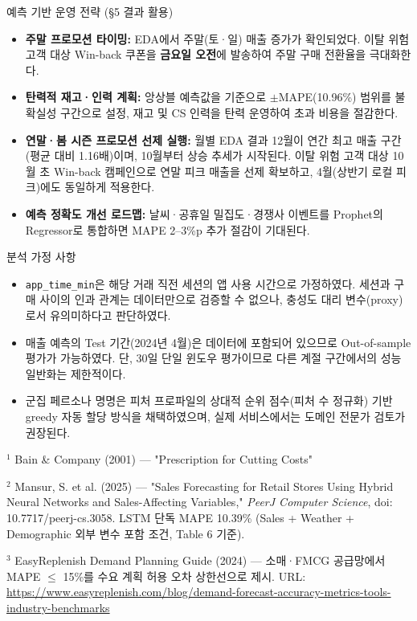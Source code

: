 \documentclass[a4paper, 11pt]{article}
\begin{document}
\begin{infobox}{예측 기반 운영 전략 (§5 결과 활용)}
\begin{itemize}[noitemsep, topsep=2pt]
  \item \textbf{주말 프로모션 타이밍:}
        EDA에서 주말(토·일) 매출 증가가 확인되었다.
        이탈 위험 고객 대상 Win-back 쿠폰을 \textbf{금요일 오전}에 발송하여
        주말 구매 전환율을 극대화한다.
  \item \textbf{탄력적 재고·인력 계획:}
        앙상블 예측값을 기준으로 $\pm$MAPE(10.96\%) 범위를 불확실성 구간으로 설정,
        재고 및 CS 인력을 탄력 운영하여 초과 비용을 절감한다.
  \item \textbf{연말·봄 시즌 프로모션 선제 실행:}
        월별 EDA 결과 12월이 연간 최고 매출 구간(평균 대비 1.16배)이며,
        10월부터 상승 추세가 시작된다. 이탈 위험 고객 대상 10월 초 Win-back 캠페인으로
        연말 피크 매출을 선제 확보하고, 4월(상반기 로컬 피크)에도 동일하게 적용한다.
  \item \textbf{예측 정확도 개선 로드맵:}
        날씨·공휴일 밀집도·경쟁사 이벤트를 Prophet의 Regressor로 통합하면
        MAPE 2–3\%p 추가 절감이 기대된다.
\end{itemize}
\end{infobox}

\begin{warnbox}{분석 가정 사항}
\begin{itemize}[noitemsep, topsep=2pt]
  \item \texttt{app\_time\_min}은 해당 거래 직전 세션의 앱 사용 시간으로 가정하였다.
        세션과 구매 사이의 인과 관계는 데이터만으로 검증할 수 없으나,
        충성도 대리 변수(proxy)로서 유의미하다고 판단하였다.
  \item 매출 예측의 Test 기간(2024년 4월)은 데이터에 포함되어 있으므로
        Out-of-sample 평가가 가능하였다.
        단, 30일 단일 윈도우 평가이므로 다른 계절 구간에서의 성능 일반화는 제한적이다.
  \item 군집 페르소나 명명은 피처 프로파일의 상대적 순위 점수(피처 수 정규화) 기반
        greedy 자동 할당 방식을 채택하였으며, 실제 서비스에서는 도메인 전문가 검토가 권장된다.
\end{itemize}
\end{warnbox}

{\small $^1$ Bain \& Company (2001) — "Prescription for Cutting Costs"}

{\small $^2$ Mansur, S. et al. (2025) — "Sales Forecasting for Retail Stores Using Hybrid Neural Networks and Sales-Affecting Variables," \textit{PeerJ Computer Science}, doi: 10.7717/peerj-cs.3058. LSTM 단독 MAPE 10.39\% (Sales + Weather + Demographic 외부 변수 포함 조건, Table 6 기준).}

{\small $^3$ EasyReplenish Demand Planning Guide (2024) — 소매·FMCG 공급망에서 MAPE $\leq$ 15\%를 수요 계획 허용 오차 상한선으로 제시. URL: \url{https://www.easyreplenish.com/blog/demand-forecast-accuracy-metrics-tools-industry-benchmarks}}

\end{document}
